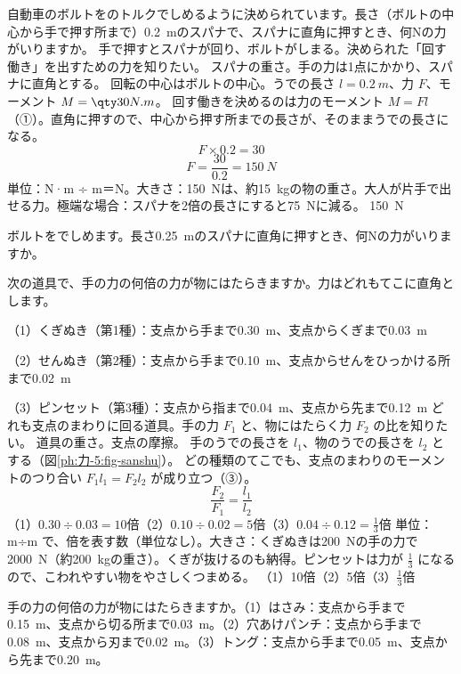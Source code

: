 \begin{phreidai}[スパナでボルトをしめる]
\label{ph:力-5:ex1}自動車のボルトをのトルクでしめるように決められています。長さ（ボルトの中心から手で押す所まで）\qty{0.2}{m}のスパナで、スパナに直角に押すとき、何Nの力がいりますか。
\phbamen
手で押すとスパナが回り、ボルトがしまる。決められた「回す働き」を出すための力を知りたい。
\phmushi
スパナの重さ。手の力は1点にかかり、スパナに直角とする。
\phzu
回転の中心はボルトの中心。うでの長さ $l=\qty{0.2}{m}$、力 $F$、モーメント $M=\pxfNm{30}$。
\phriyu
回す働きを決めるのは力のモーメント $M=Fl$（①）。直角に押すので、中心から押す所までの長さが、そのままうでの長さになる。
\phtateru
\[ F\times0.2=30 \]
\phtoku
\[ F=\frac{30}{0.2}=\qty{150}{N} \]
\phtashikame
単位：N·m ÷ m＝N。\quad 大きさ：\qty{150}{N}は、約\qty{15}{kg}の物の重さ。大人が片手で出せる力。\quad 極端な場合：スパナを2倍の長さにすると\qty{75}{N}に減る。
\kotae \qty{150}{N}
\end{phreidai}
\begin{jibun}
ボルトをでしめます。長さ\qty{0.25}{m}のスパナに直角に押すとき、何Nの力がいりますか。
\end{jibun}

\begin{phreidai}[3種類のてこの道具]
\label{ph:力-5:ex2}次の道具で、手の力の何倍の力が物にはたらきますか。力はどれもてこに直角とします。\par
（1）くぎぬき（第1種）：支点から手まで\qty{0.30}{m}、支点からくぎまで\qty{0.03}{m}\par
（2）せんぬき（第2種）：支点から手まで\qty{0.10}{m}、支点からせんをひっかける所まで\qty{0.02}{m}\par
（3）ピンセット（第3種）：支点から指まで\qty{0.04}{m}、支点から先まで\qty{0.12}{m}
\phbamen
どれも支点のまわりに回る道具。手の力 $F_1$ と、物にはたらく力 $F_2$ の比を知りたい。
\phmushi
道具の重さ。支点の摩擦。
\phzu
手のうでの長さを $l_1$、物のうでの長さを $l_2$ とする（図\ref{ph:力-5:fig-sanshu}）。
\phriyu
どの種類のてこでも、支点のまわりのモーメントのつり合い $F_1l_1=F_2l_2$ が成り立つ（③）。
\phtateru
\[ \frac{F_2}{F_1}=\frac{l_1}{l_2} \]
\phtoku
（1）$0.30\div 0.03=10$倍\qquad（2）$0.10\div 0.02=5$倍\qquad（3）$0.04\div 0.12=\tfrac{1}{3}$倍
\phtashikame
単位：m÷m で、倍を表す数（単位なし）。\quad 大きさ：くぎぬきは\qty{200}{N}の手の力で\qty{2000}{N}（約\qty{200}{kg}の重さ）。くぎが抜けるのも納得。ピンセットは力が $\tfrac13$ になるので、こわれやすい物をやさしくつまめる。
\kotae （1）10倍\quad（2）5倍\quad（3）$\tfrac{1}{3}$倍
\end{phreidai}
\begin{jibun}
手の力の何倍の力が物にはたらきますか。（1）はさみ：支点から手まで\qty{0.15}{m}、支点から切る所まで\qty{0.03}{m}。（2）穴あけパンチ：支点から手まで\qty{0.08}{m}、支点から刃まで\qty{0.02}{m}。（3）トング：支点から手まで\qty{0.05}{m}、支点から先まで\qty{0.20}{m}。
\end{jibun}

